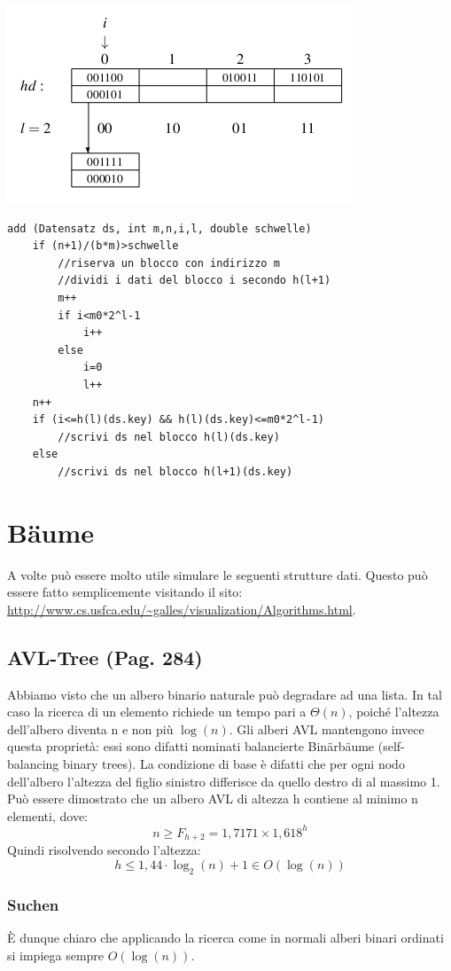 \documentclass[a4paper]{book}
\begin{document}
\begin{center}
\includegraphics[scale=0.6]{Figures/bsp3.png}
\end{center}
\begin{lstlisting}
add (Datensatz ds, int m,n,i,l, double schwelle)
	if (n+1)/(b*m)>schwelle
		//riserva un blocco con indirizzo m
		//dividi i dati del blocco i secondo h(l+1)
		m++
		if i<m0*2^l-1
			i++
		else
			i=0
			l++
	n++
	if (i<=h(l)(ds.key) && h(l)(ds.key)<=m0*2^l-1)
		//scrivi ds nel blocco h(l)(ds.key)
	else
		//scrivi ds nel blocco h(l+1)(ds.key)	
\end{lstlisting}

\chapter{Bäume}
A volte può essere molto utile simulare le seguenti strutture dati. Questo può essere fatto semplicemente visitando il sito: \url{http://www.cs.usfca.edu/~galles/visualization/Algorithms.html}.
\section{AVL-Tree (Pag. 284)}
Abbiamo visto che un albero binario naturale può degradare ad una lista. In tal caso la ricerca di un elemento richiede un tempo pari a $\Theta (n)$, poiché l'altezza dell'albero diventa n e non più $\log(n)$. Gli alberi AVL mantengono invece questa proprietà: essi sono difatti nominati balancierte Binärbäume (self-balancing binary trees). La condizione di base è difatti che per ogni nodo dell'albero l'altezza del figlio sinistro differisce da quello destro di al massimo 1. Può essere dimostrato che un albero AVL di altezza h contiene al minimo n elementi, dove:
$$ n\geq F_{h+2} = 1,7171\times 1,618^h$$
Quindi risolvendo secondo l'altezza:
$$ h\leq 1,44 \cdot\log_2 (n)+1 \in O(\log(n))$$
\subsection*{Suchen}
È dunque chiaro che applicando la ricerca come in normali alberi binari ordinati si impiega sempre $O(\log(n))$.
\end{document}

